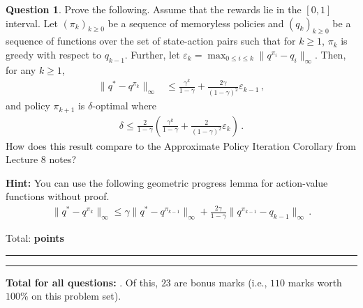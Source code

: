 \documentclass{article}
\newcommand{\norm}[1]{\| #1 \|}
\DeclareMathOperator*{\1}{\mathbbm{1}}
\newcounter{DocPoints}
\newcounter{QuestionPoints}
\newcommand{\tpoints}[1]{        	\ifthenelse{\isempty{#1}}	{	}	{		\addtocounter{DocPoints}{#1}
		\addtocounter{QuestionPoints}{#1}
	}													 	\par\mbox{}\par\noindent\hfill {Total: \bf \arabic{QuestionPoints}\xspace points}\par\mbox{}\par\hrule\hrule
	\setcounter{QuestionPoints}{0}
}
\theoremstyle{definition}
\newtheorem{question}{Question}
\theoremstyle{remark}
\begin{document}
\begin{question}
Prove the following.
Assume that the rewards lie in the $[0,1]$ interval.
Let $(\pi_k)_{k\ge 0}$ be a sequence of memoryless policies and $(q_k)_{k\ge 0}$ be a sequence of functions over the set of state-action pairs such that for $k\ge 1$,
$\pi_k$ is greedy with respect to $q_{k-1}$. Further,
let $\varepsilon_k = \max_{0\le i \le k} \| q^{\pi_i} - q_i\|_\infty$.
Then, for any $k\ge 1$,
\begin{align*}
\norm{ q^* - q^{\pi_k} }_\infty 
& \le 
\frac{\gamma^k}{1-\gamma}  + 
\frac{2\gamma}{(1-\gamma)^2} \varepsilon_{k-1}\,,
\end{align*}
and policy $\pi_{k+1}$ is $\delta$-optimal where
\begin{align*}
\delta 
\le 
\frac{2}{1-\gamma} \left( 
\frac{\gamma^k}{1-\gamma}  + \frac{2}{(1-\gamma)^2} \varepsilon_k  \right)\,.
\end{align*}
How does this result compare to the Approximate Policy Iteration Corollary from Lecture 8 notes? 

\noindent \textbf{Hint:} You can use the following geometric progress lemma for action-value functions without proof. 
\begin{align*}
\norm{ q^* - q^{\pi_k} }_\infty 
\le 
\gamma \norm{ q^* - q^{\pi_{k-1}} }_\infty  + \frac{2\gamma}{1-\gamma} \norm{ q^{\pi_{k-1}}-q_{k-1}}_\infty\,.
\end{align*}


\tpoints{15}
\end{question}





\bigskip
\bigskip

\noindent
\textbf{
\noindent
Total for all questions: }.
Of this, $23$ are bonus marks (i.e., $110$ marks worth $100\%$ on this problem set).
\end{document}
